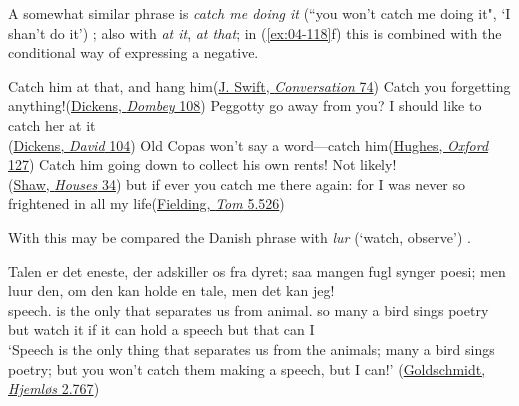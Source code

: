  \label{sec:catch} 

A somewhat similar phrase is \textit{catch me doing it} (``you won't catch me doing it", `I shan't do it') ; also with \textit{at it}, \textit{at that}; in (\ref{ex:04-118}f) this is combined with the conditional way of expressing a negative.

\ea \label{ex:04-118}
\ea
Catch him at that, and hang him\hfill(\href{https://archive.org/details/cu31924013200898/page/n109/mode/2up?q=\%22hang+him\%22&view=theater}{J. Swift, \textit{Conversation} 74})
\ex
Catch you forgetting anything!\hfill(\href{https://archive.org/details/dombeyson00dick_0/page/174/mode/2up?q=\%22Catch+you+forgetting+anything\%22&view=theater}{Dickens, \textit{Dombey} 108})
\ex
Peggotty go away from you? I should like to catch her at it\\\hfill(\href{https://archive.org/details/personalhistory05dickgoog/page/n51/mode/2up?q=\%22Peggotty+go+away\%22&view=theater}{Dickens, \textit{David} 104})
\ex
Old Copas won't say a word---catch him\hfill(\href{https://archive.org/details/tombrownatoxford00hughiala/page/132/mode/2up?q=\%22Old+Copas+won%E2%80%99t+say+a+word+%E2%80%94+catch+him\%22&view=theater}{Hughes, \textit{Oxford} 127})
\ex
Catch him going down to collect his own rents! Not likely!\\\hfill(\href{https://archive.org/details/George-Bernard-Shaw-public/Widowers%27%20housesa%20play/page/34/mode/2up?q=\%22Catch+him+going+down+to+collect+his+own+rents%21+Not+likely%21\%22&view=theater}{Shaw, \textit{Houses} 34})
\ex
but if ever you catch me there again: for I was never so frightened in all my life\hfill(\href{https://archive.org/details/bim_eighteenth-century_the-history-of-tom-jones_fielding-henry_1780_5/page/78/mode/2up?q=\%22but+if+ever+you+catch+me+there+again\%22&view=theater}{Fielding, \textit{Tom} 5.526})
\z
\z

With this may be compared the Danish phrase with \textit{lur} (`watch, observe') .


\ea \label{ex:04-124}
\ea
\gll Talen er det eneste, der adskiller os fra dyret; saa mangen fugl synger poesi; men luur den, om den kan holde en tale, men det kan jeg!\\
speech.\DEF{} is the only that separates us from animal.\DEF{} so {many a} bird sings poetry but watch it if it can hold a speech but that can I\\
\glt `Speech is the only thing that separates us from the animals; many a bird sings poetry; but you won't catch them making a speech, but I can!'
\hfill(\href{https://tekster.kb.dk/text/adl-texts-goldschmidt03-root}{Goldschmidt, \textit{Hjemløs} 2.767}) %

